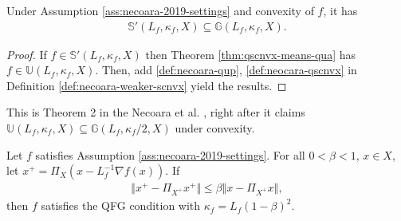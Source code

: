 \documentclass[12pt]{report}
\begin{document}
            \begin{theorem}\label{thm:qscnvx-implies-qgg}
                Under Assumption \ref{ass:necoara-2019-settings} and convexity of $f$, it has 
                \begin{align*}
                    \mathbb S'(L_f, \kappa_f, X) \subseteq \mathbb G(L_f, \kappa_f, X). 
                \end{align*}
            \end{theorem}
            \begin{proof}
                If $f \in \mathbb S'(L_f, \kappa_f, X)$ then Theorem \ref{thm:qscnvx-means-qua} has $f \in \mathbb U(L_f, \kappa_f, X)$. 
                Then, add \ref{def:necoara-qup}, \ref{def:neocara-qscnvx} in Definition \ref{def:necoara-weaker-scnvx} yield the results. 
            \end{proof}
            \begin{remark}
                This is Theorem 2 in the Necoara et al. \cite{necoara_linear_2019}, right after it claims $\mathbb U(L_f, \kappa_f, X)\subseteq \mathbb G(L_f, \kappa_f/2, X)$ under convexity. 
            \end{remark}
            \begin{theorem}\label{thm:qfg-suff}
                Let $f$ satisfies Assumption \ref{ass:necoara-2019-settings}. 
                For all $0 < \beta < 1$, $x \in X$, let $x^+ = \Pi_{X}(x - L^{-1}_f \nabla f(x))$. 
                If 
                \begin{align*}
                    \Vert x^+ - \Pi_{X^+}x^+\Vert \le \beta \Vert x - \Pi_{X^+}x \Vert, 
                \end{align*}
                then $f$ satisfies the QFG condition with $\kappa_f = L_f(1 - \beta)^2$. 
            \end{theorem}
\end{document}

